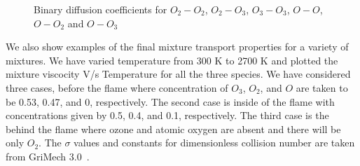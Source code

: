 \begin{figure}[H]


    \caption{Binary diffusion coefficients for $O_2-O_2$, $O_2-O_3$, $O_3-O_3$, $O-O$, $O-O_2$ and $O-O_3$}
\end{figure}


We also show examples of the final mixture transport properties for a
variety of mixtures. We have varied temperature from 300 K to 2700 K and plotted the
mixture viscocity V/s Temperature for all the three species.  We have
considered three cases, before the flame where concentration of
$O_3$, $O_2$, and $O$ are taken to be 0.53, 0.47, and 0,
respectively. The second case is inside of the flame with
concentrations given by 0.5, 0.4, and 0.1, respectively. The third
case is the behind the flame where ozone and atomic oxygen are absent and
there will be only $O_2$. The $\sigma$ values and constants for
dimensionless collision number are taken from GriMech 3.0~\cite{gri}.

